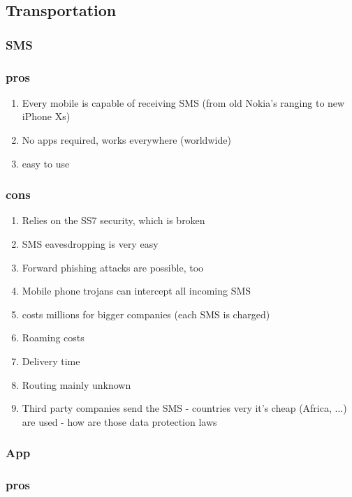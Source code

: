 \subsection{Transportation}

\subsubsection{SMS}

\subsubsection{pros}

\begin{enumerate}
	\item Every mobile is capable of receiving SMS (from old Nokia's ranging to new iPhone Xs)
	\item No apps required, works everywhere (worldwide)
	\item easy to use
\end{enumerate}

\subsubsection{cons}

\begin{enumerate}
	\item Relies on the SS7 security, which is broken
	\item SMS eavesdropping is very easy
	\item Forward phishing attacks are possible, too
	\item Mobile phone trojans can intercept all incoming SMS
	\item costs millions for bigger companies (each SMS is charged)
	\item Roaming costs
	\item Delivery time
	\item Routing mainly unknown
	\item Third party companies send the SMS - countries very it's cheap (Africa, ...) are used - how are those data protection laws
\end{enumerate}

\subsubsection{App}

\subsubsection{pros}


